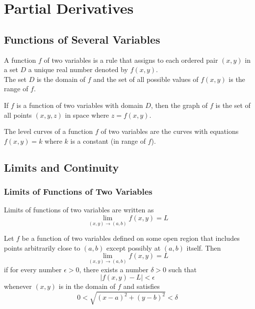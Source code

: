 \chapter{Partial Derivatives}

\section{Functions of Several Variables}

\begin{definition}
  A function \(f\) of two variables is a rule that assigns to each ordered pair \((x, y)\) in a set \(D\) a unique real number denoted by \(f(x, y)\). \\
  The set \(D\) is the domain of \(f\) and the set of all possible values of \(f(x, y)\) is the range of \(f\).
\end{definition}

\begin{definition}[Graphs]
  If \(f\) is a function of two variables with domain \(D\), then the graph of \(f\) is the set of all points \((x, y, z)\) in space where \(z = f(x, y)\).
\end{definition}

\begin{definition}
  The level curves of a function \(f\) of two variables are the curves with equations \(f(x, y) = k\) where \(k\) is a constant (in range of \(f\)).
\end{definition}

\section{Limits and Continuity}

\subsection{Limits of Functions of Two Variables}

Limits of functions of two variables are written as
\[
  \lim_{(x, y) \to (a, b)} f(x, y) = L
\]

\begin{definition}
  Let \(f\) be a function of two variables defined on some open region that includes points arbitrarily close to \((a, b)\) except possibly at \((a, b)\) itself. Then
  \[
    \lim_{(x, y) \to (a, b)} f(x, y) = L
  \]
  if for every number \(\epsilon > 0\), there exists a number \(\delta > 0\) such that
  \[
    |f(x, y) - L| < \epsilon
  \]
  whenever \((x, y)\) is in the domain of \(f\) and satisfies
  \[
    0 < \sqrt{(x - a)^2 + (y - b)^2} < \delta
  \]
\end{definition}

